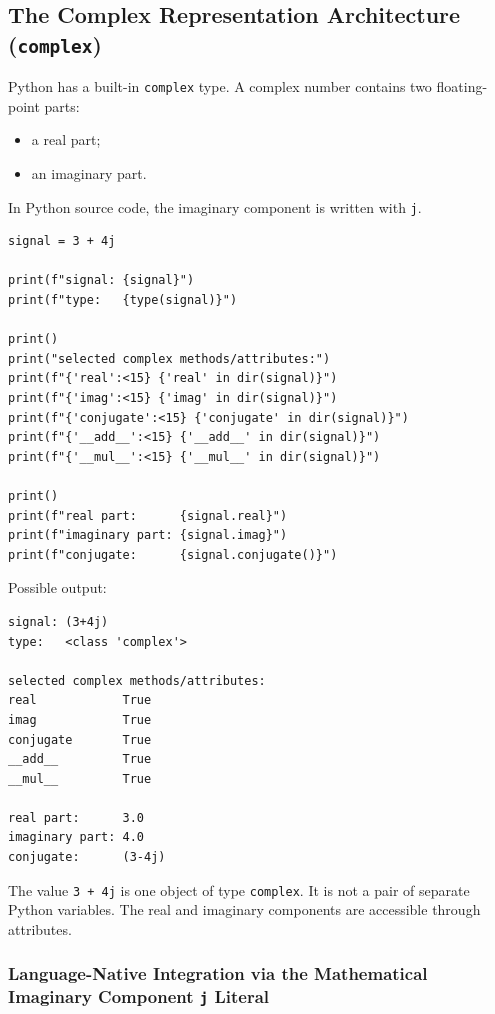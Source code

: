 \subsection{The Complex Representation Architecture (\texttt{complex})}

Python has a built-in \texttt{complex} type. A complex number contains two floating-point parts:

\begin{itemize}
    \item a real part;
    \item an imaginary part.
\end{itemize}

In Python source code, the imaginary component is written with \texttt{j}.

\begin{verbatim}
signal = 3 + 4j

print(f"signal: {signal}")
print(f"type:   {type(signal)}")

print()
print("selected complex methods/attributes:")
print(f"{'real':<15} {'real' in dir(signal)}")
print(f"{'imag':<15} {'imag' in dir(signal)}")
print(f"{'conjugate':<15} {'conjugate' in dir(signal)}")
print(f"{'__add__':<15} {'__add__' in dir(signal)}")
print(f"{'__mul__':<15} {'__mul__' in dir(signal)}")

print()
print(f"real part:      {signal.real}")
print(f"imaginary part: {signal.imag}")
print(f"conjugate:      {signal.conjugate()}")
\end{verbatim}

Possible output:

\begin{verbatim}
signal: (3+4j)
type:   <class 'complex'>

selected complex methods/attributes:
real            True
imag            True
conjugate       True
__add__         True
__mul__         True

real part:      3.0
imaginary part: 4.0
conjugate:      (3-4j)
\end{verbatim}

The value \texttt{3 + 4j} is one object of type \texttt{complex}. It is not a pair of separate Python variables. The real and imaginary components are accessible through attributes.

\subsubsection{Language-Native Integration via the Mathematical Imaginary Component \texttt{j} Literal}

